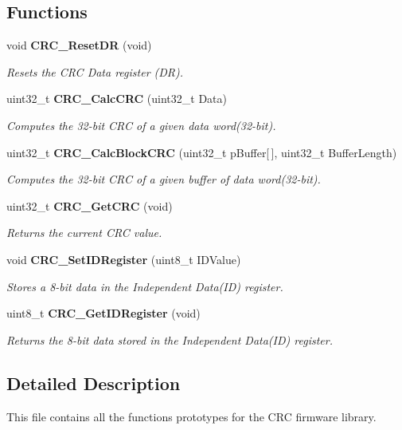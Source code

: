 \subsection*{Functions}
\begin{DoxyCompactItemize}
\item 
void \textbf{ C\+R\+C\+\_\+\+Reset\+DR} (void)
\begin{DoxyCompactList}\small\item\em Resets the C\+RC Data register (DR). \end{DoxyCompactList}\item 
uint32\+\_\+t \textbf{ C\+R\+C\+\_\+\+Calc\+C\+RC} (uint32\+\_\+t Data)
\begin{DoxyCompactList}\small\item\em Computes the 32-\/bit C\+RC of a given data word(32-\/bit). \end{DoxyCompactList}\item 
uint32\+\_\+t \textbf{ C\+R\+C\+\_\+\+Calc\+Block\+C\+RC} (uint32\+\_\+t p\+Buffer[$\,$], uint32\+\_\+t Buffer\+Length)
\begin{DoxyCompactList}\small\item\em Computes the 32-\/bit C\+RC of a given buffer of data word(32-\/bit). \end{DoxyCompactList}\item 
uint32\+\_\+t \textbf{ C\+R\+C\+\_\+\+Get\+C\+RC} (void)
\begin{DoxyCompactList}\small\item\em Returns the current C\+RC value. \end{DoxyCompactList}\item 
void \textbf{ C\+R\+C\+\_\+\+Set\+I\+D\+Register} (uint8\+\_\+t I\+D\+Value)
\begin{DoxyCompactList}\small\item\em Stores a 8-\/bit data in the Independent Data(\+I\+D) register. \end{DoxyCompactList}\item 
uint8\+\_\+t \textbf{ C\+R\+C\+\_\+\+Get\+I\+D\+Register} (void)
\begin{DoxyCompactList}\small\item\em Returns the 8-\/bit data stored in the Independent Data(\+I\+D) register. \end{DoxyCompactList}\end{DoxyCompactItemize}


\subsection{Detailed Description}
This file contains all the functions prototypes for the C\+RC firmware library. 

